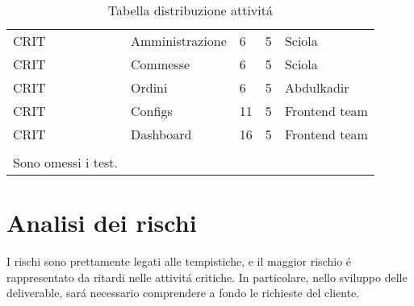 \documentclass[../../documentazione.tex]{subfiles}
\begin{document}
\begin{table}[]
\begin{tabular}{lllll}
            CRIT& \multicolumn{1}{l|}{Amministrazione}  & 6                        & 5               & Sciola                                  \\
            CRIT& \multicolumn{1}{l|}{Commesse}         & 6                        & 5               & Sciola                                  \\
            CRIT& \multicolumn{1}{l|}{Ordini}           & 6                        & 5               & Abdulkadir                              \\
            CRIT& \multicolumn{1}{l|}{Configs}          & 11                       & 5               & Frontend team                           \\
           CRIT & \multicolumn{1}{l|}{Dashboard}        & 16                       & 5               & Frontend team                           \\
            &                                       &                          &                 &                                         \\
            Sono omessi i test.                     &                                       &                          &                 &
        \end{tabular}
        \caption{Tabella distribuzione attivitá}
    \end{table}

    \section{Analisi dei rischi}\label{sec:analisi-dei-rischi}
    I rischi sono prettamente legati alle tempistiche, e il maggior rischio é rappresentato da ritardi nelle attivitá critiche.
    In particolare, nello sviluppo delle deliverable, sará necessario comprendere a fondo le richieste del cliente.
\end{document}
